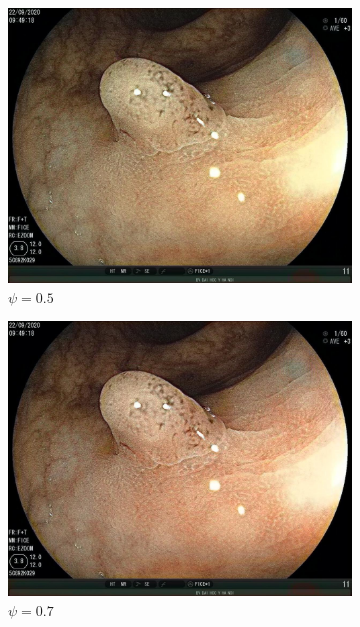 \documentclass[12pt]{extreport}
\begin{document}
\begin{figure}[H]
\begin{subfigure}[H]{0.19\textwidth}
        \centering
        \includegraphics[width=\linewidth]{psi/05.jpeg}
        \caption{$ \psi = 0.5 $}
    \end{subfigure}
    \begin{subfigure}[H]{0.19\textwidth}
        \centering
        \includegraphics[width=\linewidth]{psi/07.jpeg}
        \caption{$ \psi = 0.7 $}
    \end{subfigure}
    \begin{subfigure}[H]{0.19\textwidth}
        \centering

\end{subfigure}
\end{figure}
\end{document}
